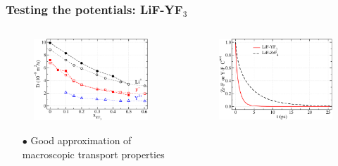 \documentclass{beamer}
\begin{document}
\begin{frame}
   \frametitle{Testing the potentials: LiF-YF$_3$}


   \begin{columns}
      \begin{column}{6cm}
         \begin{figure}
   \includegraphics[width=\textwidth]{LiFYF3diffusion}
   \end{figure}

        \begin{itemize}
           \item[$\bullet$] Good approximation of \\ macroscopic transport properties
        \end{itemize}
      \end{column}
      \begin{column}{6cm}
               \begin{figure}
   \includegraphics[width=\textwidth]{LiFYF3cage}
   \end{figure}


\end{column}
\end{columns}
\end{frame}
\end{document}
